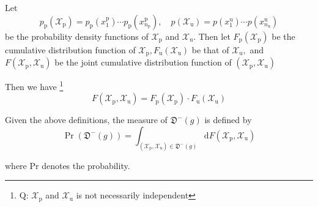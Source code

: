 \documentclass[12pt]{article}
\theoremstyle{definition}
\begin{document}
 Let
 \[
 p_{\mathrm{p}}\left(\mathcal{X}_{\mathrm{p}}\right)=p_{\mathrm{p}}\left(x_{1}^{\mathrm{p}}\right) \cdots p_{\mathrm{p}}\left(x_{n_{\mathrm{p}}}^{\mathrm{p}}\right), \quad p\left(\mathcal{X}_{\mathrm{u}}\right)=p\left(x_{1}^{\mathrm{u}}\right) \cdots p\left(x_{n_{\mathrm{u}}}^{\mathrm{u}}\right)
 \]
 be the probability density functions of $\mathcal{X}_{\mathrm{p}}$ and $\mathcal{X}_{\mathrm{u}} .$ Then let $F_{\mathrm{p}}\left(\mathcal{X}_{\mathrm{p}}\right)$ be the cumulative distribution function of $\mathcal{X}_{\mathrm{p}}, F_{\mathrm{u}}\left(\mathcal{X}_{\mathrm{u}}\right)$ be that of $\mathcal{X}_{\mathrm{u}},$ and
 $F\left(\mathcal{X}_{\mathrm{p}}, \mathcal{X}_{\mathrm{u}}\right)$
 be the joint cumulative distribution function of $\left(\mathcal{X}_{\mathrm{p}}, \mathcal{X}_{\mathrm{u}}\right)$
 
 Then we have \footnote{Q: $\mathcal{X}_{\mathrm{p}}$ and $\mathcal{X}_{\mathrm{u}}$ is not necessarily independent  }
 $$F\left(\mathcal{X}_{\mathrm{p}}, \mathcal{X}_{\mathrm{u}}\right)=F_{\mathrm{p}}\left(\mathcal{X}_{\mathrm{p}}\right) \cdot F_{\mathrm{u}}\left(\mathcal{X}_{\mathrm{u}}\right)$$
 
 Given the above definitions, the measure of $\mathfrak{D}^{-}(g)$ is defined by $$
 \operatorname{Pr}\left(\mathfrak{D}^{-}(g)\right)=\int_{\left(\mathcal{X}_{\mathrm{p}}, \mathcal{X}_{\mathrm{u}}\right) \in \mathfrak{D}^{-}(g)} \mathrm{d} F\left(\mathcal{X}_{\mathrm{p}}, \mathcal{X}_{\mathrm{u}}\right)
 $$
 
 where Pr denotes the probability. 
 
\end{document}
